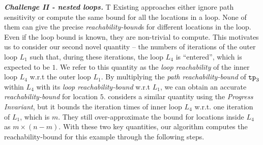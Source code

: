 \textbf{\emph{Challenge II - nested loops.}} T
Existing approaches either ignore path sensitivity or compute the same bound for all the locations in a loop.
None of them can give the precise \emph{reachability-bound}s for different locations in the loop.
Even if the loop bound is known, they are non-trivial to compute.
This motivates us to consider our second novel quantity --
the numbers of iterations of the {outer loop $L_1$} such that,
during these iterations, the loop $L_4$ is ``entered'', which is expected to be $1$. 
We refer to this quantity as the \emph{loop reachability} of the inner loop $L_4$ w.r.t the outer loop $L_1$.
By multiplying the \emph{path reachability-bound} of $\mathtt{tp}_3$ within $L_4$
with its \emph{loop reachability-bound} w.r.t $L_1$, we can obtain an accurate
\emph{reachability-bound} for location $5$.
\cite{GulwaniJK09} considers a similar quantity using the \emph{Progress Invariant}, but it bounds the iteration times of {inner loop $L_4$} w.r.t. one iteration of $L_1$, which is $m$. They still over-approximate the bound for locations inside $L_4$ as $m \times (n - m)$.
With these two key quantities, our algorithm computes the reachability-bound for this example through the following steps.
